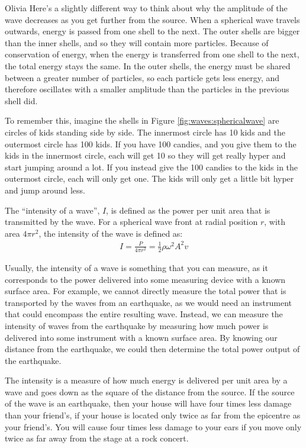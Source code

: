 \begin{studentOpinion}{Olivia}
Here's a slightly different way to think about why the amplitude of the wave decreases as you get further from the source. When a spherical wave travels outwards, energy is passed from one shell to the next. The outer shells are bigger than the inner shells, and so they will contain more particles. Because of conservation of energy, when the energy is transferred from one shell to the next, the total energy stays the same. In the outer shells, the energy must be shared between a greater number of particles, so each particle gets less energy, and therefore oscillates with a smaller amplitude than the particles in the previous shell did.

To remember this, imagine the shells in Figure \ref{fig:waves:sphericalwave} are circles of kids standing side by side. The innermost circle has 10 kids and the outermost circle has 100 kids. If you have 100 candies, and you give them to the kids in the innermost circle, each will get 10 so they will get really hyper and start jumping around a lot. If you instead give the 100 candies to the kids in the outermost circle, each will only get one. The kids will only get a little bit hyper and jump around less.
\end{studentOpinion}

The ``intensity of a wave'', $I$, is defined as the power per unit area that is transmitted by the wave. For a spherical wave front at radial position $r$, with area $4\pi r^2$, the intensity of the wave is defined as:
\begin{align*}
I = \frac{P}{4\pi r^2} = \frac{1}{2}\rho  \omega^2 A^2 v
\end{align*}

Usually, the intensity of a wave is something that you can measure, as it corresponds to the power delivered into some measuring device with a known surface area. For example, we cannot directly measure the total power that is transported by the waves from an earthquake, as we would need an instrument that could encompass the entire resulting wave. Instead, we can measure the intensity of waves from the earthquake by measuring how much power is delivered into some instrument with a known surface area. By knowing our distance from the earthquake, we could then determine the total power output of the earthquake. 

The intensity is a measure of how much energy is delivered per unit area by a wave and goes down as the square of the distance from the source. If the source of the wave is an earthquake, then your house will have four times less damage than your friend's, if your house is located only twice as far from the epicentre as your friend's. You will cause four times less damage to your ears if you move only twice as far away from the stage at a rock concert.


